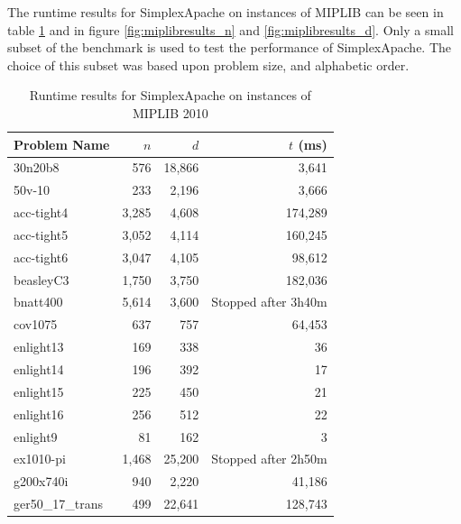 \documentclass[nocopyrightspace]{acm_proc_article-sp}
\begin{document}
The runtime results for SimplexApache on instances of MIPLIB can be seen in table \ref{tab:miplibresults} and in figure \ref{fig:miplibresults_n} and \ref{fig:miplibresults_d}. Only a small subset of the benchmark is used to test the performance of SimplexApache. The choice of this subset was based upon problem size, and alphabetic order. 
\begin{table}[h!]
\label{tab:miplibresults}
\caption{Runtime results for SimplexApache on instances of MIPLIB 2010 \cite{KochEtAl2011}}
\begin{tabularx}{\columnwidth}{|X|r|r|r|}
\hline
Problem Name     & $n$  & $d$   & $t$ (ms) \\ \hline
30n20b8          & 576  & 18,866 & 3,641   \\ \hline
50v-10           & 233  & 2,196  & 3,666   \\ \hline
acc-tight4       & 3,285 & 4,608  & 174,289 \\ \hline
acc-tight5       & 3,052 & 4,114  & 160,245 \\ \hline
acc-tight6       & 3,047 & 4,105  & 98,612  \\ \hline
beasleyC3        & 1,750 & 3,750  & 182,036 \\ \hline
bnatt400         & 5,614 & 3,600 & Stopped after 3h40m \\ \hline
cov1075          & 637  & 757   & 64,453  \\ \hline
enlight13        & 169  & 338   & 36     \\ \hline
enlight14        & 196  & 392   & 17     \\ \hline
enlight15        & 225  & 450   & 21     \\ \hline
enlight16        & 256  & 512   & 22     \\ \hline
enlight9         & 81   & 162   & 3      \\ \hline
ex1010-pi		 & 1,468 & 25,200 & Stopped after 2h50m \\ \hline
g200x740i        & 940  & 2,220  & 41,186  \\ \hline
ger50\_17\_trans & 499  & 22,641 & 128,743 \\ \hline
\end{tabularx}
\end{table}
\end{document}
